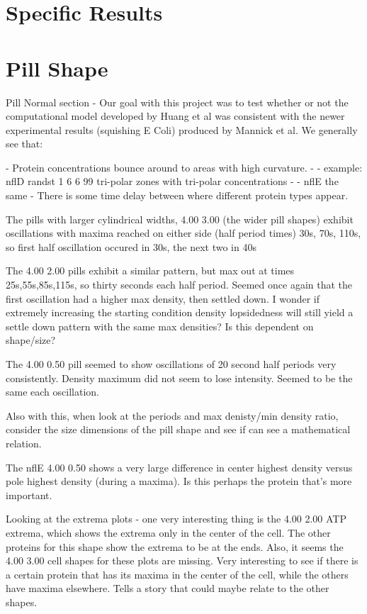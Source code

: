 \documentclass[letterpaper,twocolumn,amsmath,amssymb,pre]{revtex4-1}
\begin{document}
\section{Specific Results}
\section{Pill Shape}
Pill Normal section -
Our goal with this project was to test whether or not the computational
model developed by Huang et al was consistent with the newer experimental
results (squishing E Coli) produced by Mannick et al. We generally see
that:

- Protein concentrations bounce around to areas with high curvature.
- - example: nflD randst 1 6 6 99 tri-polar zones with tri-polar concentrations
- - nflE the same
- There is some time delay between where different protein types appear.



The pills with larger cylindrical widths, 4.00 3.00 (the wider pill shapes)
exhibit oscillations with maxima reached on either side (half period
times) 30s, 70s, 110s, so first half oscillation occured in 30s, the
next two in 40s

The 4.00 2.00 pills exhibit a similar pattern, but max out at times
25s,55s,85s,115s, so thirty seconds each half period.  Seemed once again that
the first oscillation had a higher max density, then settled down.  I
wonder if extremely increasing the starting condition density
lopsidedness will still yield a settle down pattern with the same max
densities?  Is this dependent on shape/size?

The 4.00 0.50 pill seemed to show oscillations of 20 second half
periods very consistently.  Density maximum did not seem to lose
intensity.  Seemed to be the same each oscillation.

 Also with this, when look at the periods and max
denisty/min density ratio, consider the size dimensions of the pill
shape and see if can see a mathematical relation.

The nflE 4.00 0.50 shows a very large difference in center highest density
versus pole highest density (during a maxima).  Is this perhaps the
protein that's more important.

Looking at the extrema plots - one very interesting thing is the 4.00
2.00 ATP extrema, which shows the extrema only in the center of the
cell.  The other proteins for this shape show the extrema to be at the
ends.  Also, it seems the 4.00 3.00 cell shapes for these plots are
missing.  Very interesting to see if there is a certain protein that
has its maxima in the center of the cell, while the others have maxima
elsewhere.  Tells a story that could maybe relate to the other shapes.
\end{document}
